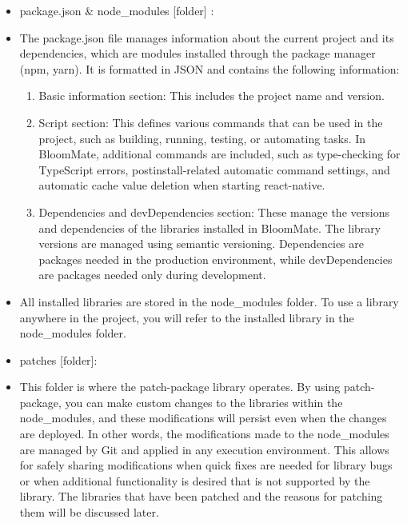 \documentclass[conference, a4paper]{IEEEtran}
\begin{document}
\begin{enumerate}
\begin{enumerate}
\begin{itemize}
            \item package.json \& node\_modules [folder] :
            \item[] The package.json file manages information about the current project and its dependencies, which are modules installed through the package manager (npm, yarn). It is formatted in JSON and contains the following information:
            \begin{enumerate}
                \item Basic information section: This includes the project name and version.
                \item Script section: This defines various commands that can be used in the project, such as building, running, testing, or automating tasks. In BloomMate, additional commands are included, such as type-checking for TypeScript errors, postinstall-related automatic command settings, and automatic cache value deletion when starting react-native.
                \item Dependencies and devDependencies section: These manage the versions and dependencies of the libraries installed in BloomMate. The library versions are managed using semantic versioning. Dependencies are packages needed in the production environment, while devDependencies are packages needed only during development.
            \end{enumerate}
            \item[] All installed libraries are stored in the node\_modules folder. To use a library anywhere in the project, you will refer to the installed library in the node\_modules folder. \\

            \item patches [folder]:
            \item[] This folder is where the patch-package library operates. By using patch-package, you can make custom changes to the libraries within the node\_modules, and these modifications will persist even when the changes are deployed. In other words, the modifications made to the node\_modules are managed by Git and applied in any execution environment. This allows for safely sharing modifications when quick fixes are needed for library bugs or when additional functionality is desired that is not supported by the library. The libraries that have been patched and the reasons for patching them will be discussed later. \\


\end{itemize}
\end{enumerate}
\end{enumerate}
\end{document}
